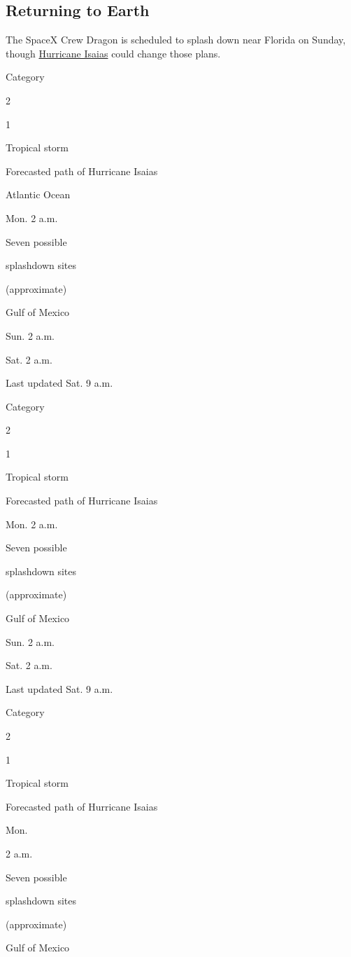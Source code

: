 \hypertarget{returning-to-earth}{%
\subsection{Returning to Earth}\label{returning-to-earth}}

The SpaceX Crew Dragon is scheduled to splash down near Florida on
Sunday, though
\href{https://www.nytimes.com/interactive/2020/07/31/us/hurricane-isaias-tracker-map.html}{Hurricane
Isaias} could change those plans.

Category

2

1

Tropical storm

Forecasted path of Hurricane Isaias

Atlantic Ocean

Mon. 2 a.m.

Seven possible

splashdown sites

(approximate)

Gulf of Mexico

Sun. 2 a.m.

Sat. 2 a.m.

Last updated Sat. 9 a.m.

Category

2

1

Tropical storm

Forecasted path of Hurricane Isaias

Mon. 2 a.m.

Seven possible

splashdown sites

(approximate)

Gulf of Mexico

Sun. 2 a.m.

Sat. 2 a.m.

Last updated Sat. 9 a.m.

Category

2

1

Tropical storm

Forecasted path of Hurricane Isaias

Mon.

2 a.m.

Seven possible

splashdown sites

(approximate)

Gulf of Mexico

